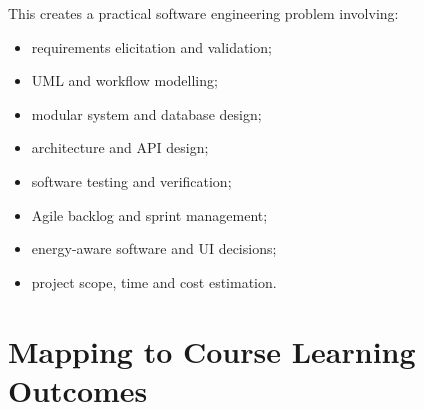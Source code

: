 \documentclass[11pt,a4paper]{article}
\begin{document}
This creates a practical software engineering problem involving:

\begin{itemize}[leftmargin=0.7cm]
    \item requirements elicitation and validation;
    \item UML and workflow modelling;
    \item modular system and database design;
    \item architecture and API design;
    \item software testing and verification;
    \item Agile backlog and sprint management;
    \item energy-aware software and UI decisions;
    \item project scope, time and cost estimation.
\end{itemize}

\section{Mapping to Course Learning Outcomes}
\end{document}

